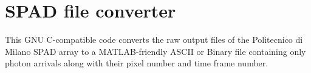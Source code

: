 \chapter{SPAD file converter}
\label{appendix:spadcounts}
This GNU C-compatible code converts the raw output files of the Politecnico di Milano SPAD array to a MATLAB-friendly ASCII or Binary file containing only photon arrivals along with their pixel number and time frame number.

{
  \scriptsize \tt
  
}
